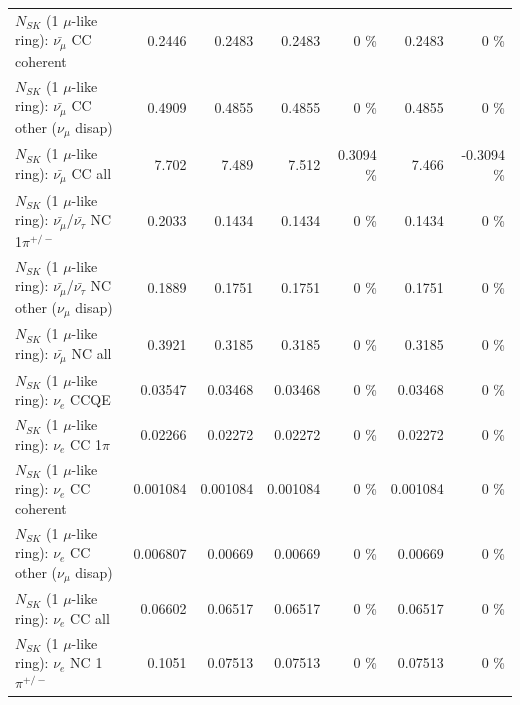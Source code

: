 \begin{table}
\begin{tabular}{| l | r | r | r  r | r  r |}
                       $N_{SK}$ (1 $\mu$-like ring): $\bar{\nu_\mu}$ CC coherent &          0.2446 &          0.2483 &          0.2483 &        0 \%  &          0.2483 &        0 \%  \\ 
        $N_{SK}$ (1 $\mu$-like ring): $\bar{\nu_\mu}$ CC other ($\nu_\mu$ disap) &          0.4909 &          0.4855 &          0.4855 &        0 \%  &          0.4855 &        0 \%  \\ 
                          $N_{SK}$ (1 $\mu$-like ring): $\bar{\nu_{\mu}}$ CC all &           7.702 &           7.489 &           7.512 &   0.3094 \%  &           7.466 &  -0.3094 \%  \\ 
\hline
  $N_{SK}$ (1 $\mu$-like ring): $\bar{\nu_\mu}$/$\bar{\nu_\tau}$ NC 1$\pi^{+/-}$ &          0.2033 &          0.1434 &          0.1434 &        0 \%  &          0.1434 &        0 \%  \\ 
$N_{SK}$ (1 $\mu$-like ring): $\bar{\nu_\mu}$/$\bar{\nu_\tau}$ NC other ($\nu_\mu$ disap) &          0.1889 &          0.1751 &          0.1751 &        0 \%  &          0.1751 &        0 \%  \\ 
                          $N_{SK}$ (1 $\mu$-like ring): $\bar{\nu_{\mu}}$ NC all &          0.3921 &          0.3185 &          0.3185 &        0 \%  &          0.3185 &        0 \%  \\ 
\hline
\hline
\hline
                                      $N_{SK}$ (1 $\mu$-like ring): $\nu_e$ CCQE &         0.03547 &         0.03468 &         0.03468 &        0 \%  &         0.03468 &        0 \%  \\ 
                                 $N_{SK}$ (1 $\mu$-like ring): $\nu_e$ CC 1$\pi$ &         0.02266 &         0.02272 &         0.02272 &        0 \%  &         0.02272 &        0 \%  \\ 
                               $N_{SK}$ (1 $\mu$-like ring): $\nu_e$ CC coherent &        0.001084 &        0.001084 &        0.001084 &        0 \%  &        0.001084 &        0 \%  \\ 
                $N_{SK}$ (1 $\mu$-like ring): $\nu_e$ CC other ($\nu_\mu$ disap) &        0.006807 &         0.00669 &         0.00669 &        0 \%  &         0.00669 &        0 \%  \\ 
                                  $N_{SK}$ (1 $\mu$-like ring): $\nu_{e}$ CC all &         0.06602 &         0.06517 &         0.06517 &        0 \%  &         0.06517 &        0 \%  \\ 
\hline
                           $N_{SK}$ (1 $\mu$-like ring): $\nu_e$ NC 1$\pi^{+/-}$ &          0.1051 &         0.07513 &         0.07513 &        0 \%  &         0.07513 &        0 \%  \\ 

\end{tabular}
\end{table}
